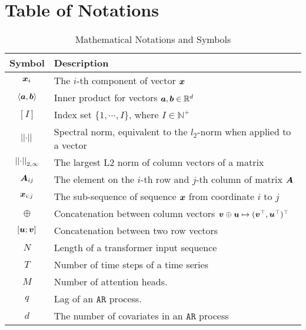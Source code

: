 

    




\section{Table of Notations}
\label{sec:tab_notation}

\begin{table}[h]
    \caption{Mathematical Notations and Symbols}
    \centering
    \begin{tabular}{cl}
    \toprule
        Symbol & Description \\
    \midrule
        $\bm{x}_i$ & The $i$-th component of vector $\bm{x}$ \\
        $\Braket{\bm{a},\bm{b}}$ & Inner product for vectors $\bm{a},\bm{b}\in \mathbb{R}^d$ \\
        $[I]$ & Index set $\{1,\cdots,I\}$, where $I\in\mathbb{N}^+$ \\
        $\left\lvert \left\lvert\cdot\right\rvert \right\rvert$ & Spectral norm, equivalent to the $l_2$-norm when applied to a vector \\
        $\left\lvert \left\lvert\cdot\right\rvert \right\rvert_{2, \infty}$ & The largest L2 norm of column vectors of a matrix \\
        $\bm{A}_{ij}$ & The element on the $i$-th row and $j$-th column of matrix $\bm{A}$ \\
        $\bm{x}_{i:j}$ & The sub-sequence of sequence $\bm{x}$ from coordinate $i$ to $j$ \\
        $\oplus$ & Concatenation between column vectors $\bm{v} \oplus \bm{u} \mapsto ( \bm{v}^\top, \bm{u}^\top)^\top$ \\
        $[\bm{u} ; \bm{v}]$ & Concatenation between two row vectors \\
    \midrule
        $N$ & Length of a transformer input sequence \\
        $T$ & Number of time steps of a time series \\
        $M$ & Number of attention heads. \\
        $q$ & Lag of an $\mathtt{AR}$ process. \\
        $d$ & The number of covariates in an $\mathtt{AR}$ process \\

\end{tabular}
\end{table}
